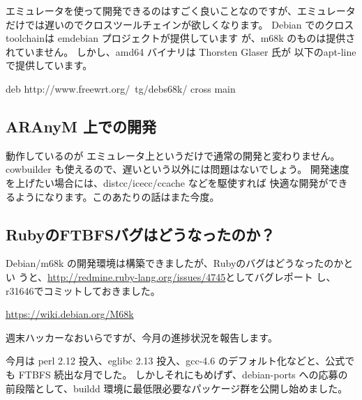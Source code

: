 \documentclass[mingoth,a4paper]{jsarticle}
\begin{document}
エミュレータを使って開発できるのはすごく良いことなのですが、エミュレータ
だけでは遅いのでクロスツールチェインが欲しくなります。
Debian でのクロスtoolchainは emdebian プロジェクトが提供しています
が、m68k のものは提供されていません。
しかし、amd64 バイナリは Thorsten Glaser 氏が
以下のapt-line で提供しています。

\begin{commandline}
deb http://www.freewrt.org/~tg/debs68k/ cross main
\end{commandline}

\subsection{ARAnyM 上での開発}

動作しているのが エミュレータ上というだけで通常の開発と変わりません。
cowbuilder も使えるので、遅いという以外には問題はないでしょう。
開発速度を上げたい場合には、distcc/icecc/ccache などを駆使すれば
快適な開発ができるようになります。このあたりの話はまた今度。

\subsection{RubyのFTBFSバグはどうなったのか？}

Debian/m68k の開発環境は構築できましたが、Rubyのバグはどうなったのかとい
うと、\url{http://redmine.ruby-lang.org/issues/4745}としてバグレポート
し、r31646でコミットしておきました。


\begin{thebibliography}{}
  \url{https://wiki.debian.org/M68k}
\end{thebibliography}


週末ハッカーなおいらですが、今月の進捗状況を報告します。

今月は perl 2.12 投入、eglibc 2.13 投入、gcc-4.6 のデフォルト化などと、公式でも FTBFS 続出な月でした。
しかしそれにもめげず、debian-ports への応募の前段階として、buildd 環境に最低限必要なパッケージ群を公開し始めました。
\end{document}
